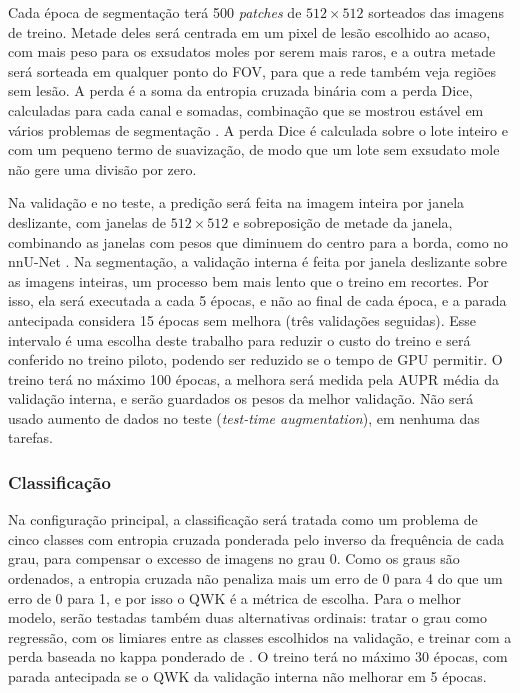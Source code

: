 Cada época de segmentação terá 500 \textit{patches} de $512 \times 512$ sorteados das imagens de treino. Metade deles será centrada em um pixel de lesão escolhido ao acaso, com mais peso para os exsudatos moles por serem mais raros, e a outra metade será sorteada em qualquer ponto do FOV, para que a rede também veja regiões sem lesão. A perda é a soma da entropia cruzada binária com a perda Dice, calculadas para cada canal e somadas, combinação que se mostrou estável em vários problemas de segmentação \cite{ma2021loss}. A perda Dice é calculada sobre o lote inteiro e com um pequeno termo de suavização, de modo que um lote sem exsudato mole não gere uma divisão por zero.

Na validação e no teste, a predição será feita na imagem inteira por janela deslizante, com janelas de $512 \times 512$ e sobreposição de metade da janela, combinando as janelas com pesos que diminuem do centro para a borda, como no nnU-Net \cite{isensee2021nnunet}. Na segmentação, a validação interna é feita por janela deslizante sobre as imagens inteiras, um processo bem mais lento que o treino em recortes. Por isso, ela será executada a cada 5 épocas, e não ao final de cada época, e a parada antecipada considera 15 épocas sem melhora (três validações seguidas). Esse intervalo é uma escolha deste trabalho para reduzir o custo do treino e será conferido no treino piloto, podendo ser reduzido se o tempo de GPU permitir. O treino terá no máximo 100 épocas, a melhora será medida pela AUPR média da validação interna, e serão guardados os pesos da melhor validação. Não será usado aumento de dados no teste (\textit{test-time augmentation}), em nenhuma das tarefas.

\subsubsection{Classificação}
\label{sec:protocolo-clf}

Na configuração principal, a classificação será tratada como um problema de cinco classes com entropia cruzada ponderada pelo inverso da frequência de cada grau, para compensar o excesso de imagens no grau 0. Como os graus são ordenados, a entropia cruzada não penaliza mais um erro de 0 para 4 do que um erro de 0 para 1, e por isso o QWK é a métrica de escolha. Para o melhor modelo, serão testadas também duas alternativas ordinais: tratar o grau como regressão, com os limiares entre as classes escolhidos na validação, e treinar com a perda baseada no kappa ponderado de . O treino terá no máximo 30 épocas, com parada antecipada se o QWK da validação interna não melhorar em 5 épocas.

